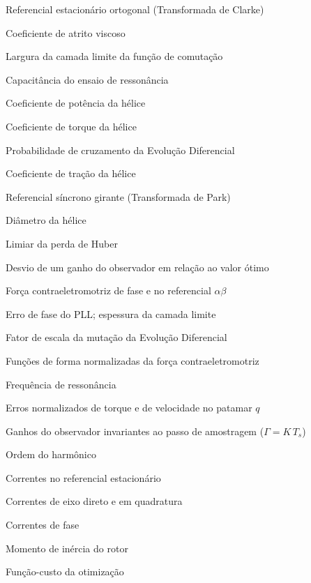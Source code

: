 \begin{simbolos}
	\item[$\alpha, \beta$] Referencial estacionário ortogonal (Transformada de Clarke)
	\item[$B$] Coeficiente de atrito viscoso
	\item[$BL$] Largura da camada limite da função de comutação
	\item[$C$] Capacitância do ensaio de ressonância
	\item[$C_P$] Coeficiente de potência da hélice
	\item[$C_Q$] Coeficiente de torque da hélice
	\item[$C_r$] Probabilidade de cruzamento da Evolução Diferencial
	\item[$C_T$] Coeficiente de tração da hélice
	\item[$d, q$] Referencial síncrono girante (Transformada de Park)
	\item[$D_{prop}$] Diâmetro da hélice
	\item[$\delta$] Limiar da perda de Huber
	\item[$\Delta\Gamma$] Desvio de um ganho do observador em relação ao valor ótimo
	\item[$e_k, e_\alpha, e_\beta$] Força contraeletromotriz de fase e no referencial $\alpha\beta$
	\item[$\epsilon$] Erro de fase do PLL; espessura da camada limite
	\item[$F$] Fator de escala da mutação da Evolução Diferencial
	\item[$f_k, f_\alpha, f_\beta$] Funções de forma normalizadas da força contraeletromotriz
	\item[$f_r$] Frequência de ressonância
	\item[$g_{T,q}, g_{\omega,q}$] Erros normalizados de torque e de velocidade no patamar $q$
	\item[$\Gamma_{s1}, \Gamma_{s2}, \Gamma_t$] Ganhos do observador invariantes ao passo de amostragem ($\Gamma = K\,T_s$)
	\item[$h$] Ordem do harmônico
	\item[$i_\alpha, i_\beta$] Correntes no referencial estacionário
	\item[$i_d, i_q$] Correntes de eixo direto e em quadratura
	\item[$i_k, i_a, i_b, i_c$] Correntes de fase
	\item[$J$] Momento de inércia do rotor
	\item[$J(\mathbf{x})$] Função-custo da otimização

\end{simbolos}
